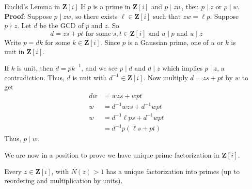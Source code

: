 \begin{Proposition}{Euclid's Lemma in $\mathbf{Z}[i]$}{}
    If $ p $ is a prime in $ \mathbf{Z}[i] $ and $ p\mid zw $, then $ p\mid z $ or $ p\mid w $.
    \tcblower{}
    \textbf{Proof}: Suppose $p \mid zw$, so there exists
    $\ell \in \mathbf{Z}[i]$ such that $z w=\ell p$. Suppose $p \nmid z$. Let $d$ be the GCD of $p$ and $z$. So
    \[ d=z s+p t \text { for some } s, t \in \mathbf{Z}[i] \text { and } u \mid p \text { and } u \mid z \]
    Write $p=d k$ for some $k \in \mathbf{Z}[i]$. Since $p$ is a Gaussian prime, one of $u$ or $k$ is unit in $\mathbf{Z}[i]$.

    If $k$ is unit, then $d=p k^{-1}$, and we see $p \mid d$ and $d \mid z$ which implies $p \mid z$, a contradiction.
    Thus, $d$ is unit with $d^{-1} \in \mathbf{Z}[i]$. Now multiply $d=z s+p t$ by $w$ to get
    \begin{align*}
        d w & =w z s+w p t                  \\
        w   & =d^{-1} w z s+d^{-1} w p t    \\
        w   & =d^{-1} \ell p s+d^{-1} w p t \\
            & =d^{-1} p(\ell s+p t)
    \end{align*}
    Thus, $p \mid w $.
\end{Proposition}
We are now in a position to prove we have unique prime factorization in $ \mathbf{Z}[i] $.
\begin{Theorem}{}{}
    Every $z\in\mathbf{Z}[i]$, with $N (z) > 1$ has a unique factorization into
    primes (up to reordering and multiplication by units).
\end{Theorem}
